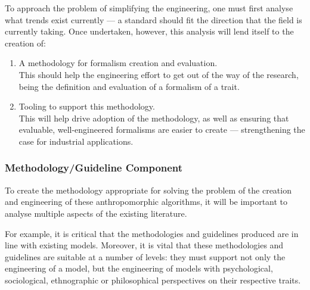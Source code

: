 To approach the problem of simplifying the engineering, one must first analyse what trends exist currently --- a standard should fit the direction that the field is currently taking. Once undertaken, however, this analysis will lend itself to the creation of:
\begin{enumerate}
    \item A methodology for formalism creation and evaluation.\\
    This should help the engineering effort to get out of the way of the research, being the definition and evaluation of a formalism of a trait.
    \item Tooling to support this methodology.\\
    This will help drive adoption of the methodology, as well as ensuring that evaluable, well-engineered formalisms are easier to create --- strengthening the case for industrial applications.
\end{enumerate}

\subsubsection*{Methodology/Guideline Component}\label{sec:methodology}
To create the methodology appropriate for solving the problem of the creation and engineering of these anthropomorphic algorithms, it will be important to analyse multiple aspects of the existing literature.\par

For example, it is critical that the methodologies and guidelines produced are in line with existing models. Moreover, it is vital that these methodologies and guidelines are suitable at a number of levels: they must support not only the engineering of a model, but the engineering of models with psychological, sociological, ethnographic or philosophical perspectives on their respective traits.\par

